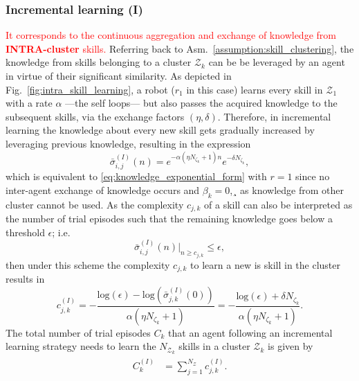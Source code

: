 \subsubsection{\textbf{Incremental learning (I)}}
\textcolor{red}{It corresponds to the continuous aggregation and exchange of knowledge from \textbf{INTRA-cluster} skills.} Referring back to Asm.~\ref{assumption:skill_clustering}, the knowledge from skills belonging to a cluster ${\mathcal{Z}_k}$ can be be leveraged by an agent in virtue of their significant similarity. As depicted in Fig.~\ref{fig:intra_skill_learning}, a robot ($r_1$ in this case) learns every skill in $\mathcal{Z}_1$ with a rate $\alpha$ ---the self loops--- but also passes the acquired knowledge to the subsequent skills, via the exchange factors $(\eta,\delta)$. Therefore, in incremental learning the knowledge about every new skill gets gradually increased by leveraging previous knowledge, resulting in the expression
\begin{equation*}\label{eq:remaining_knowledge__IL}
	\bar{\sigma}^{(I)}_{i,j}(n) = e^{-\alpha  \left(\eta N_{\zeta_k}+1\right) n} e^{-\delta N_{\zeta_k}},
\end{equation*}
which is equivalent to \eqref{eq:knowledge_exponential_form} with $r=1$ since no inter-agent exchange of knowledge occurs and $\beta_k = 0$,¸ as knowledge from other cluster cannot be used. As the complexity $c_{j,k}$ of a skill can also be interpreted as the number of trial episodes such that the remaining knowledge goes below a threshold $\epsilon$; i.e.
\begin{equation*}
	\bar{\sigma}^{(I)}_{i,j}(n) \rvert_{n \ge c_{j,k}} \leq \epsilon,
\end{equation*}
then under this scheme the complexity $c_{j,k}$ to learn a new is skill in the cluster results in
\begin{equation}\label{eq:complexity_IL}
	c^{(I)}_{j,k} = -\frac{\text{log}(\epsilon) - \text{log}\left(\bar{\sigma}^{(I)}_{j,k}(0)\right)}{\alpha (\eta N_{\zeta_k}+ 1)} = -\frac{\text{log}(\epsilon) + \delta N_{\zeta_k}}{\alpha (\eta N_{\zeta_k}+ 1)}  .
\end{equation}
The total number of trial episodes $ C_k $ that an agent following an incremental learning strategy needs to learn the $N_{\mathcal{Z}_k}$ skills in a cluster $ \mathcal{Z}_k $ is given by
\begin{align}\label{eq:total_episodes_incremental}
	\begin{split}
		C^{(I)}_k &= \sum^{N_{\mathcal{Z}}}_{j=1} c^{(I)}_{j,k}.
	\end{split}
\end{align}

